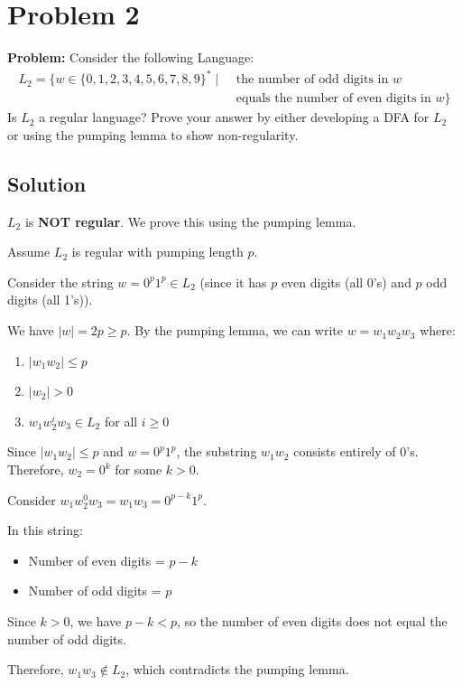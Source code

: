 \documentclass[12pt]{article}
\begin{document}
\section*{Problem 2}

\textbf{Problem:} Consider the following Language:
\begin{align*}
L_2 = \{w \in \{0, 1, 2, 3, 4, 5, 6, 7, 8, 9\}^* \mid &\text{ the number of odd digits in } w\\
&\text{ equals the number of even digits in } w\}
\end{align*}
Is $L_2$ a regular language? Prove your answer by either developing a DFA for $L_2$ or using the pumping lemma to show non-regularity.

\subsection*{Solution}

$L_2$ is \textbf{NOT regular}. We prove this using the pumping lemma.


Assume $L_2$ is regular with pumping length $p$.

Consider the string $w = 0^p 1^p \in L_2$ (since it has $p$ even digits (all 0's) and $p$ odd digits (all 1's)).

We have $|w| = 2p \geq p$. By the pumping lemma, we can write $w = w_1w_2w_3$ where:
\begin{enumerate}
    \item $|w_1w_2| \leq p$
    \item $|w_2| > 0$
    \item $w_1w_2^iw_3 \in L_2$ for all $i \geq 0$
\end{enumerate}

Since $|w_1w_2| \leq p$ and $w = 0^p 1^p$, the substring $w_1w_2$ consists entirely of 0's. Therefore, $w_2 = 0^k$ for some $k > 0$.

Consider $w_1w_2^0w_3 = w_1w_3 = 0^{p-k}1^p$.

In this string:
\begin{itemize}
    \item Number of even digits = $p - k$
    \item Number of odd digits = $p$
\end{itemize}

Since $k > 0$, we have $p - k < p$, so the number of even digits does not equal the number of odd digits.

Therefore, $w_1w_3 \notin L_2$, which contradicts the pumping lemma.
\end{document}
